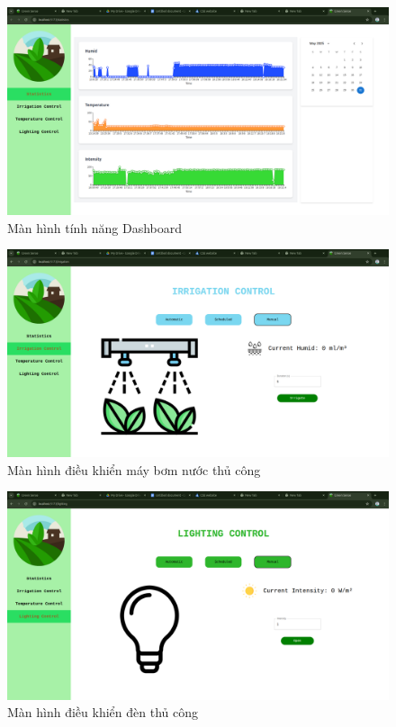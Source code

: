 \begin{figure}[H]
    \centering
    \includegraphics[width=1\linewidth]{content/images/statistics.png}
    \caption{Màn hình tính năng Dashboard}
\end{figure}

\begin{figure}[H]
    \centering
    \includegraphics[width=1\linewidth]{content/images/pump_manual.png}
    \caption{Màn hình điều khiển máy bơm nước thủ công}
\end{figure}

\begin{figure}[H]
    \centering
    \includegraphics[width=1\linewidth]{content/images/light_manual.png}
    \caption{Màn hình điều khiển đèn thủ công}
\end{figure}

